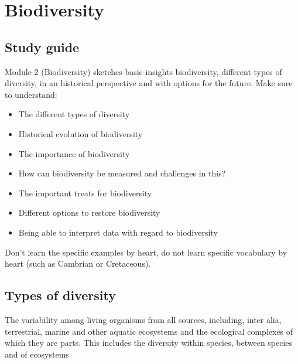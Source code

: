\documentclass[../summary.tex]{subfiles}
\begin{document}
	
	\section{Biodiversity}
	
	\subsection{Study guide}
	
	Module 2 (Biodiversity) sketches basic insights biodiversity, different types of diversity, in an historical perspective and with options for the future. Make sure to understand:
	\begin{itemize}
		\item The different types of diversity
		\item Historical evolution of biodiversity
		\item The importance of biodiversity
		\item How can biodiversity be measured and challenges in this?
		\item The important treats for biodiversity
		\item Different options to restore biodiversity
		\item Being able to interpret data with regard to biodiversity
	\end{itemize} 
	
	Don’t learn the specific examples by heart, do not learn specific vocabulary by heart (such as Cambrian or Cretaceous).
	\\
	
	\subsection{Types of diversity}
	The variability among living organisms from all sources, including, inter alia, terrestrial, marine and other aquatic ecosystems and the ecological complexes of which they are parts. This includes the diversity within species, between species and of ecosystems
	
\end{document}
